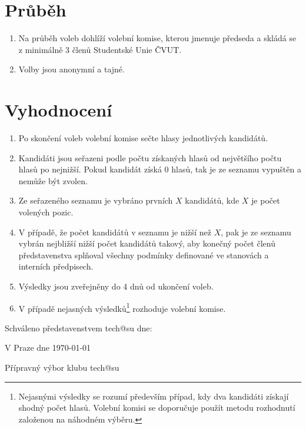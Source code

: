 \documentclass[10pt]{article}
\begin{document}
\section{Průběh}
	\begin{enumerate}
		\item Na průběh voleb dohlíží volební komise, kterou jmenuje předseda a skládá se z minimálně 3 členů Studentské Unie ČVUT.
		\item Volby jsou anonymní a tajné.
	\end{enumerate}

\section{Vyhodnocení}
	\begin{enumerate}
		\item Po skončení voleb volební komise sečte hlasy jednotlivých kandidátů.
		\item Kandidáti jsou seřazeni podle počtu získaných hlasů od největšího počtu hlasů po nejnižší. Pokud kandidát získá 0 hlasů, tak je ze seznamu vypuštěn a nemůže být zvolen.
		\item Ze seřazeného seznamu je vybráno prvních $X$ kandidátů, kde $X$ je počet volených pozic.
		\item V případě, že počet kandidátů v seznamu je nižší než $X$, pak je ze seznamu vybrán nejbližší nižší počet kandidátů takový, aby konečný počet členů představenstva splňoval všechny podmínky definované ve stanovách a interních předpisech.
		\item Výsledky jsou zveřejněny do 4 dnů od ukončení voleb.
		\item V případě nejasných výsledků\footnote{Nejasnými výsledky se rozumí především případ, kdy dva kandidáti získají shodný počet hlasů. Volební komisi se doporučuje použít metodu rozhodnutí založenou na náhodném výběru.} rozhoduje volební komise.
	\end{enumerate}

\vspace{10mm}

Schváleno představenstvem tech@su dne:

\vspace{30mm}

\hfill V Praze dne \today

\hfill Přípravný výbor klubu tech@su
\end{document}
